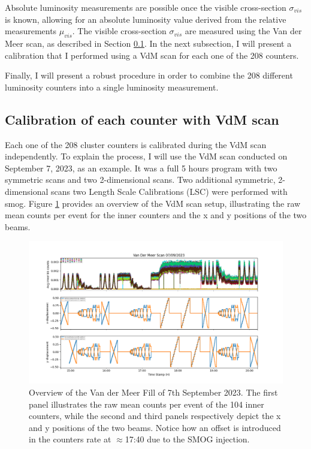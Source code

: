 Absolute luminosity measurements are possible once the visible cross-section $\sigma_{vis}$ is known, allowing for an absolute luminosity value derived from the relative measurements $\mu_{vis}$. The visible cross-section $\sigma_{vis}$ are measured using the Van der Meer scan, as described in Section \ref{sec:calibration_vdm}. In the next subsection, I will present a calibration that I performed using a VdM scan for each one of the 208 counters.

Finally, I will present a robust procedure in order to combine the 208 different luminosity counters into a single luminosity measurement.

\subsection{Calibration of each counter with VdM scan}\label{sec:calibration_vdm}
Each one of the 208 cluster counters is calibrated during the VdM scan independently. To explain the process, I will use the VdM scan conducted on September 7, 2023, as an example.
It was a full 5 hours program with two symmetric scans and two 2-dimensional scans. Two additional symmetric, 2-dimensional scans two Length Scale Calibrations (LSC) were performed with smog. Figure \ref{fig:inner_vdm_sep} provides an overview of the VdM scan setup, illustrating the raw mean counts per event for the inner counters and the x and y positions of the two beams.

\begin{figure}
    \centering
    \includegraphics[width=\textwidth]{figures/inner_counts_bkg.png}
    \caption{Overview of the Van der Meer Fill of 7th September 2023. The first panel illustrates the raw mean counts per event of the 104 inner counters, while the second and third panels respectively depict the x and y positions of the two beams. Notice how an offset is introduced in the counters rate at $\approx$17:40 due to the SMOG injection.}
    \label{fig:inner_vdm_sep}
\end{figure}


